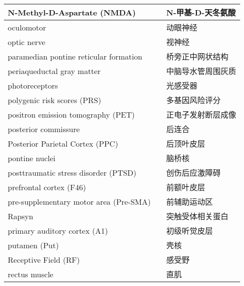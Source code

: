 \begin{longtable}{lll}
	\midrule
	N-Methyl-D-Aspartate (NMDA)   && N-甲基-D-天冬氨酸  \\
	
	\midrule
	oculomotor     && 动眼神经   \\
	
	\midrule
	optic nerve     && 视神经   \\
	
	\midrule
	paramedian pontine reticular formation     && 桥旁正中网状结构   \\
	
	\midrule
	periaqueductal gray matter     && 中脑导水管周围灰质   \\
	
	\midrule
	photoreceptors     && 光感受器   \\
	
	\midrule
	polygenic risk scores (PRS)     && 多基因风险评分   \\
	
	\midrule
	positron emission tomography (PET)     && 正电子发射断层成像   \\
	
	\midrule
	posterior commissure     && 后连合   \\
	
	\midrule
	Posterior Parietal Cortex (PPC)     && 后顶叶皮层   \\
	
	\midrule
	pontine nuclei     && 	脑桥核   \\
	
	\midrule
	posttraumatic stress disorder (PTSD)     && 	创伤后应激障碍   \\
	
	\midrule
	prefrontal cortex (F46)     && 	前额叶皮层   \\
	
	\midrule
	pre-supplementary motor area (Pre-SMA)     && 	前辅助运动区   \\
	
	\midrule
	Rapsyn   && 突触受体相关蛋白  \\
	
	\midrule
	primary auditory cortex (A1)   && 初级听觉皮层  \\
	
	\midrule
	putamen (Put)   && 壳核  \\
	
	\midrule
	Receptive Field (RF)   && 感受野  \\
	
	\midrule
	rectus muscle   && 直肌  \\
	

\end{longtable}
